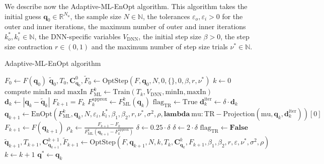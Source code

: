 We describe now the Adaptive-ML-EnOpt algorithm. This algorithm takes the initial guess $\mathbf{q}_0\in\mathbb{R}^{N_u}$, the sample size $N\in\mathbb{N}$, the tolerances $\varepsilon_o,\varepsilon_i>0$ for the outer and inner iterations, the maximum number of outer and inner iterations $k_o^*,k_i^*\in\mathbb{N}$, the DNN-specific variables $V_{\mathrm{DNN}}$, the initial step size $\beta>0$, the step size contraction $r\in(0,1)$ and the maximum number of step size trials $\nu^*\in\mathbb{N}$.
\begin{algorithm}[H]%
\caption{\label{AML-EnOpt}Adaptive-ML-EnOpt algorithm}
\begin{algorithmic}[1]
\State $F_0\gets F(\mathbf{q}_0)$
\State $\tilde{\mathbf{q}}_0,T_0,\mathbf{C}_{\mathbf{q}_0}^0,\tilde{F}_0\gets\mathrm{OptStep}(F,\mathbf{q}_0,N,0,\{\},0,\beta,r,\nu^*)$
\State $k\gets 0$
\State $\text{compute }\mathrm{minIn}\text{ and }\mathrm{maxIn}$
\State $F_\mathrm{ML}^k\gets\mathrm{Train}(T_k, V_\mathrm{DNN}, \mathrm{minIn}, \mathrm{maxIn})$
\State $\mathbf{d}_k\gets|\mathbf{q}_k-\tilde{\mathbf{q}}_k|$
\State $F_{k+1}=F_k$
\State $F^\mathrm{approx}_k\gets F_\mathrm{ML}^k(\mathbf{q}_k)$
\State $\mathrm{flag}_\mathrm{TR}\gets \mathrm{True}$
\State $\mathbf{d}^\mathrm{iter}_k\gets\delta\cdot\mathbf{d}_k$
\State $\mathbf{q}_{k+1}\gets\mathrm{EnOpt}(F_\mathrm{ML}^k,\mathbf{q}_k,N,\varepsilon_i,k_i^*,\beta_1, \beta_2,r,\nu^*, \sigma^2, \rho, \mathbf{lambda}\:\mathrm{mu}:\mathrm{TR-Projection}(\mathrm{mu}, \mathbf{q}_k, \mathbf{d}^\mathrm{iter}_k))[0]$
\State $F_{k+1}\gets F(\mathbf{q}_{k+1})$
\State $\rho_k\gets \frac{F_{k+1}-F_k}{F_\mathrm{ML}^k(\mathbf{q}_{k+1}-F^\mathrm{approx}_k)}$
\State $\delta\gets0.25\cdot\delta$
\EndIf
{}
\State $\delta\gets2\cdot\delta$
\EndIf
{}
\State $\mathrm{flag}_\mathrm{TR}\gets\mathbf{False}$
\EndIf
\EndWhile
\EndWhile
\State $\tilde{\mathbf{q}}_{k+1},T_{k+1},\mathbf{C}_{\mathbf{q}_{k+1}}^{k+1},\tilde{F}_{k+1}\gets\mathrm{OptStep}(F,\mathbf{q}_{k+1},N,k,T_k,\mathbf{C}_{\mathbf{q}_k}^k, F_{k+1}, \beta_1, \beta_2, r, \varepsilon ,\nu^*, \sigma^2, \rho)$
\State $k\gets k+1$
\EndWhile
\State \Return $\mathbf{q}^*\gets\mathbf{q}_k$
\EndProcedure
\end{algorithmic}
\end{algorithm}